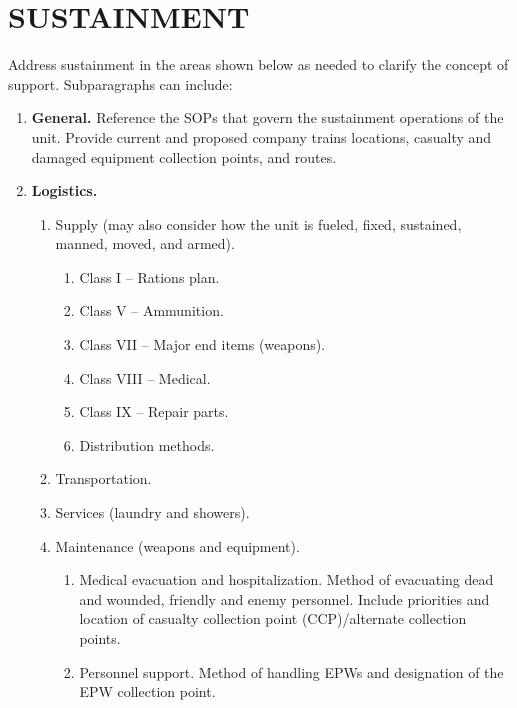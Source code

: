 \documentclass[letterpaper,tgtermes,9pt,microtype,colorlinks=true,urlcolor=blue,DIV=calc,pagesize]{scrartcl}
\begin{document}
\section{\textbf{SUSTAINMENT}}
\label{sec:org3c40ecd}
Address sustainment in the areas shown below as needed to clarify the concept of support. Subparagraphs can include:
\begin{enumerate}
\item \textbf{General.}
\label{sec:orga6f57cc}
Reference the SOPs that govern the sustainment operations of the unit. Provide current and proposed
company trains locations, casualty and damaged equipment collection points, and routes.
\item \textbf{Logistics.}
\label{sec:orgd1b85b7}
\begin{enumerate}
\item Supply (may also consider how the unit is fueled, fixed, sustained, manned, moved, and armed).
\begin{enumerate}
\item Class I – Rations plan.
\item Class V – Ammunition.
\item Class VII – Major end items (weapons).
\item Class VIII – Medical.
\item Class IX – Repair parts.
\item Distribution methods.
\end{enumerate}
\item Transportation.
\item Services (laundry and showers).
\item Maintenance (weapons and equipment).
\begin{enumerate}
\item Medical evacuation and hospitalization. Method of evacuating dead and wounded, friendly and enemy personnel. Include priorities and location of casualty collection point (CCP)/alternate collection points.
\item Personnel support. Method of handling EPWs and designation of the EPW collection point.
\end{enumerate}
\end{enumerate}
\end{enumerate}
\end{document}
